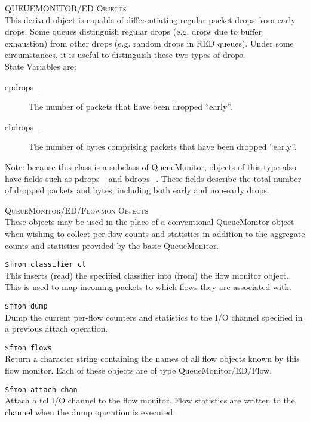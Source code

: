 \textsc{QUEUEMONITOR/ED Objects}\\
This derived object is capable of differentiating regular packet drops
from early drops. Some queues distinguish regular drops (e.g. drops due to
buffer exhaustion) from other drops (e.g. random drops in RED queues).
Under some circumstances, it is useful to distinguish these two types of
drops. 
\\
State Variables are:
\begin{description}
\item[epdrops\_] The number of packets that have been dropped ``early''. 

\item[ebdrops\_] The number of bytes comprising packets that have been
dropped ``early''. 
\end{description}

Note: because this class is a subclass of QueueMonitor, objects of this
type also have fields such as pdrops\_ and bdrops\_. These fields describe
the total number of dropped packets and bytes, including both early and
non-early drops. 


\textsc{QueueMonitor/ED/Flowmon Objects}\\
These objects may be used in the place of a conventional QueueMonitor
object when wishing to collect per-flow counts and statistics in addition
to the aggregate counts and statistics provided by the basic QueueMonitor. 

{\tt \$fmon classifier \<cl\>}\\
This inserts (read) the specified classifier into (from) the flow monitor
object. This is used to map incoming packets to which flows they are
associated with. 

{\tt \$fmon dump}\\
Dump the current per-flow counters and statistics to the I/O channel
specified in a previous attach operation. 

{\tt \$fmon flows}\\
Return a character string containing the names of all flow objects known
by this flow monitor. Each of these objects are of type
QueueMonitor/ED/Flow. 

{\tt \$fmon attach \<chan\>}\\
Attach a tcl I/O channel to the flow monitor. Flow statistics are written
to the channel when the dump operation is executed. 

